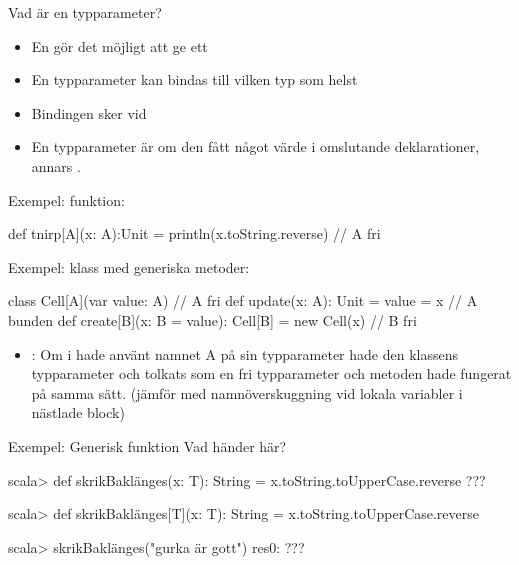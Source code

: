 \begin{Slide}{Vad är en typparameter?}\SlideFontSmall
  \setlength{\leftmargini}{0pt}

\begin{itemize}
\item En  gör det möjligt att ge ett 
\item En  typparameter kan bindas till vilken typ som helst
\item Bindingen sker vid 
\item En typparameter är  om den  fått något värde i omslutande deklarationer, annars .
\end{itemize}
Exempel:  funktion:
\begin{Code}
def tnirp[A](x: A):Unit = println(x.toString.reverse) // A fri
\end{Code}
\pause
Exempel:  klass med generiska metoder:
\begin{Code}
class Cell[A](var value: A){                          // A fri
  def update(x: A): Unit = value = x                  // A bunden
  def create[B](x: B = value): Cell[B] = new Cell(x)  // B fri
}
\end{Code}
\pause
\begin{itemize}
\item {}: Om  i  hade använt namnet A på sin typparameter hade den  klassens typparameter och tolkats som en  fri typparameter och metoden hade fungerat på samma sätt. (jämför med namnöverskuggning vid lokala variabler i nästlade block)
\end{itemize}

\end{Slide}

\ifkompendium\else
\begin{Slide}{Exempel: Generisk funktion}
Vad händer här?
\begin{REPL}

scala> def skrikBaklänges(x: T): String = x.toString.toUpperCase.reverse
???



scala> def skrikBaklänges[T](x: T): String = x.toString.toUpperCase.reverse

scala> skrikBaklänges("gurka är gott")
res0: ???

\end{REPL}
\end{Slide}


